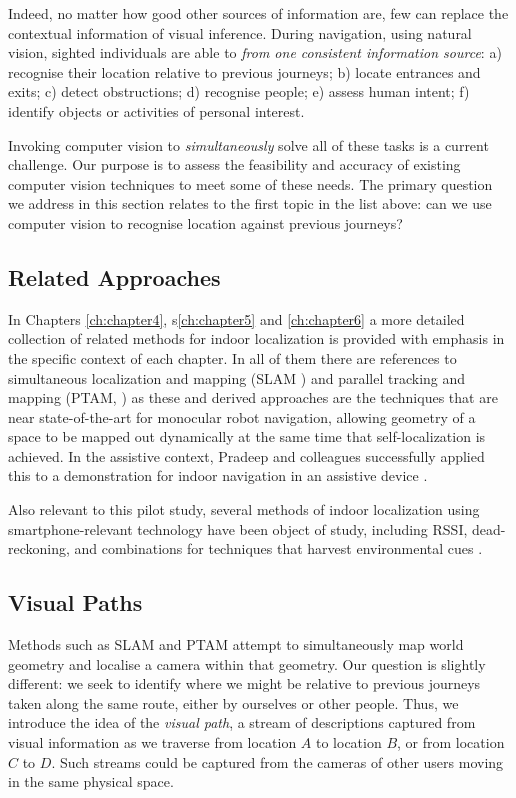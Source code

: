Indeed, no matter how good other sources of information are, few can replace the contextual information of visual inference.  During navigation, using natural vision, sighted individuals are able to {\em from one consistent information source}: a) recognise their location relative to previous journeys; b) locate entrances and exits; c) detect obstructions; d) recognise people; e) assess human intent;
f) identify objects or activities of personal interest.

Invoking computer vision to {\it simultaneously} solve all of these tasks is a current challenge.  Our purpose is to assess the feasibility and accuracy of existing computer vision techniques to meet some of these needs.  The primary question we address in this section relates to the first topic in the list above: can we use computer vision to recognise location against previous journeys?

\subsection{Related Approaches}
 
In Chapters \ref{ch:chapter4}, s\ref{ch:chapter5} and \ref{ch:chapter6} a more detailed collection of related methods for indoor localization is provided with emphasis in the specific context of each chapter. In all of them there are references to simultaneous localization and mapping (SLAM \cite{Durrant-Whyte2006}) and parallel tracking and mapping (PTAM, \cite{Klein2009}) as these and derived approaches are the techniques that  are near state-of-the-art for monocular robot navigation, allowing geometry of a space to be mapped out dynamically at the same time that self-localization is achieved.  In the assistive context, Pradeep and colleagues successfully applied this to a demonstration for indoor navigation in an assistive device \cite{Pradeep2010}.

Also relevant to this pilot study, several methods of indoor localization using smartphone-relevant technology have been object of study, including RSSI, dead-reckoning, and combinations for techniques that harvest environmental cues \cite{Wang2012,Shen}. 
 

\subsection{Visual Paths} 

 Methods such as SLAM and PTAM attempt to simultaneously map world geometry and localise a camera within that geometry.  Our question is slightly different: we seek to identify where we might be relative to previous journeys taken along the same route, either by ourselves or other people.  Thus, we introduce the idea of the {\it visual path}, a stream of descriptions captured from visual information as we traverse from location $A$ to location $B$, or from location $C$ to $D$. Such streams could be captured from the cameras of other users moving in the same physical space.

